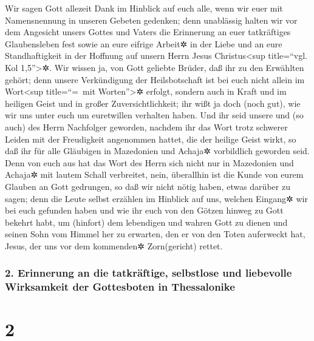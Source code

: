 Wir sagen Gott allezeit Dank im Hinblick auf euch alle,
wenn wir euer mit Namensnennung in unseren Gebeten gedenken;
 denn unablässig halten wir vor dem Angesicht unsers
Gottes und Vaters die Erinnerung an euer tatkräftiges Glaubensleben fest
sowie an eure eifrige Arbeit✲ in der Liebe und an eure Standhaftigkeit
in der Hoffnung auf unsern Herrn Jesus Christus\textless sup
title=``vgl. Kol 1,5''\textgreater✲.  Wir wissen ja, von
Gott geliebte Brüder, daß ihr zu den Erwählten gehört; 
denn unsere Verkündigung der Heilsbotschaft ist bei euch nicht allein im
Wort\textless sup title=``=~mit Worten''\textgreater✲ erfolgt, sondern
auch in Kraft und im heiligen Geist und in großer Zuversichtlichkeit;
ihr wißt ja doch (noch gut), wie wir uns unter euch um euretwillen
verhalten haben.  Und ihr seid unsere und (so auch) des
Herrn Nachfolger geworden, nachdem ihr das Wort trotz schwerer Leiden
mit der Freudigkeit angenommen hattet, die der heilige Geist wirkt,
 so daß ihr für alle Gläubigen in Mazedonien und Achaja✲
vorbildlich geworden seid.  Denn von euch aus hat das Wort
des Herrn sich nicht nur in Mazedonien und Achaja✲ mit lautem Schall
verbreitet, nein, überallhin ist die Kunde von eurem Glauben an Gott
gedrungen, so daß wir nicht nötig haben, etwas darüber zu sagen;
 denn die Leute selbst erzählen im Hinblick auf uns,
welchen Eingang✲ wir bei euch gefunden haben und wie ihr euch von den
Götzen hinweg zu Gott bekehrt habt, um (hinfort) dem lebendigen und
wahren Gott zu dienen  und seinen Sohn vom Himmel her zu
erwarten, den er von den Toten auferweckt hat, Jesus, der uns vor dem
kommenden✲ Zorn(gericht) rettet.

\hypertarget{erinnerung-an-die-tatkruxe4ftige-selbstlose-und-liebevolle-wirksamkeit-der-gottesboten-in-thessalonike}{%
\subsubsection{2. Erinnerung an die tatkräftige, selbstlose und
liebevolle Wirksamkeit der Gottesboten in
Thessalonike}\label{erinnerung-an-die-tatkruxe4ftige-selbstlose-und-liebevolle-wirksamkeit-der-gottesboten-in-thessalonike}}

\hypertarget{section-1}{%
\section{2}\label{section-1}}

